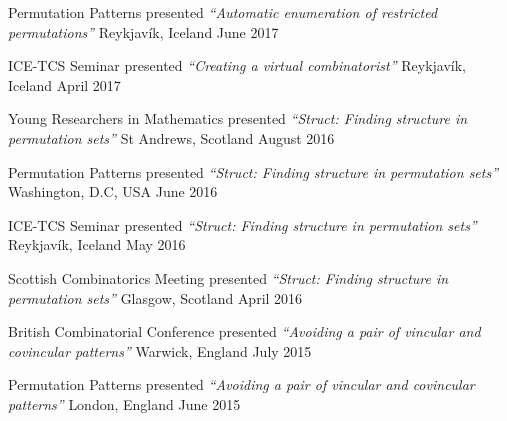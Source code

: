 \begin{cvhonors}

\cvhonor
  {Permutation Patterns} %
  {presented \textit{``Automatic enumeration of restricted permutations''}} %
  {Reykjavík, Iceland} %
  {June 2017} %


\cvhonor
  {ICE-TCS Seminar} %
  {presented \textit{``Creating a virtual combinatorist''}} %
  {Reykjavík, Iceland} %
  {April 2017} %


\cvhonor
  {Young Researchers in Mathematics} %
  {presented \textit{``Struct: Finding structure in permutation sets''}} %
  {St Andrews, Scotland} %
  {August 2016} %


\cvhonor
  {Permutation Patterns} %
  {presented \textit{``Struct: Finding structure in permutation sets''}} %
  {Washington, D.C, USA} %
  {June 2016} %


\cvhonor
  {ICE-TCS Seminar} %
  {presented \textit{``Struct: Finding structure in permutation sets''}} %
  {Reykjavík, Iceland} %
  {May 2016} %


\cvhonor
  {Scottish Combinatorics Meeting} %
  {presented \textit{``Struct: Finding structure in permutation sets''}} %
  {Glasgow, Scotland} %
  {April 2016} %


\cvhonor
  {British Combinatorial Conference} %
  {presented \textit{``Avoiding a pair of vincular and covincular patterns''}} %
  {Warwick, England} %
  {July 2015} %


\cvhonor
  {Permutation Patterns} %
  {presented \textit{``Avoiding a pair of vincular and covincular patterns''}} %
  {London, England} %
  {June 2015} %


\end{cvhonors}
